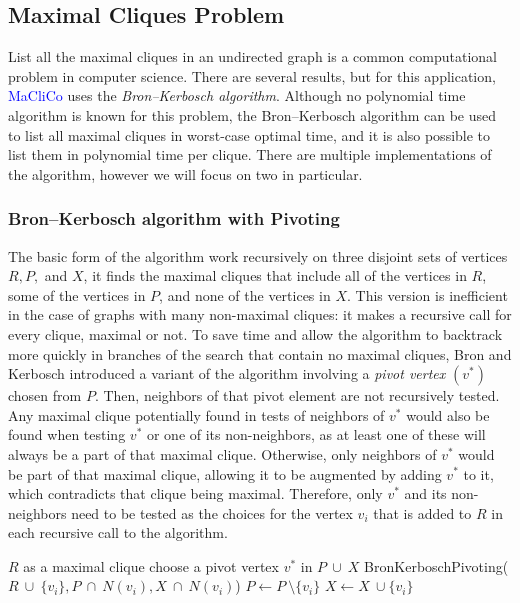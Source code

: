 \documentclass[10pt]{article} %
\begin{document}
\subsection{Maximal Cliques Problem}
\label{1operation}
List all the maximal cliques in an undirected graph is a common computational problem in computer science. There are several results, but for this application, \textcolor{blue}{MaCliCo} uses the \textit{Bron–Kerbosch algorithm}. Although no polynomial time algorithm is known for this problem, the Bron–Kerbosch algorithm can be used to list all maximal cliques in worst-case optimal time, and it is also possible to list them in polynomial time per clique. There are multiple implementations of the algorithm, however we will focus on two in particular.

\subsubsection{Bron–Kerbosch algorithm with Pivoting}
The basic form of the algorithm work recursively on three disjoint sets of vertices $R, P,$ and $X$, it finds the maximal cliques that include all of the vertices in $R$, some of the vertices in $P$, and none of the vertices in $X$. This version is inefficient in the case of graphs with many non-maximal cliques: it makes a recursive call for every clique, maximal or not. To save time and allow the algorithm to backtrack more quickly in branches of the search that contain no maximal cliques, Bron and Kerbosch introduced a variant of the algorithm involving a \textit{pivot vertex} $(v^{*})$ chosen from $P$. Then, neighbors of that pivot element are not recursively tested. Any maximal clique potentially found in tests of neighbors of $v^{*}$ would also be found when testing $v^{*}$ or one of its non-neighbors, as at least one of these will always be a part of that maximal clique. Otherwise, only neighbors of $v^{*}$ would be part of that maximal clique, allowing it to be augmented by adding $v^{*}$ to it, which contradicts that clique being maximal. Therefore, only $v^{*}$ and its non-neighbors need to be tested as the choices for the vertex $v_{i}$ that is added to $R$ in each recursive call to the algorithm.
\begin{algorithm}
\caption{Bron–Kerbosch algorithm with Pivoting}
\label{alg:BK with Pivoting}
\begin{algorithmic}[1] %
        \State \Return $R$ as a maximal clique
    \EndIf
    \State choose a pivot vertex $v^{*}$ in $P\ \cup\ X$
        \State BronKerboschPivoting($R\ \cup\ \{v_{i}\}, P\ \cap\ N(v_{i}), X\ \cap \ N(v_{i})$)
        \State $P \gets P\ \setminus \{v_{i}\}$
        \State $X \gets X\ \cup \{v_{i}\}$
    \EndFor
\EndProcedure
\end{algorithmic}
\end{algorithm}
\end{document}
